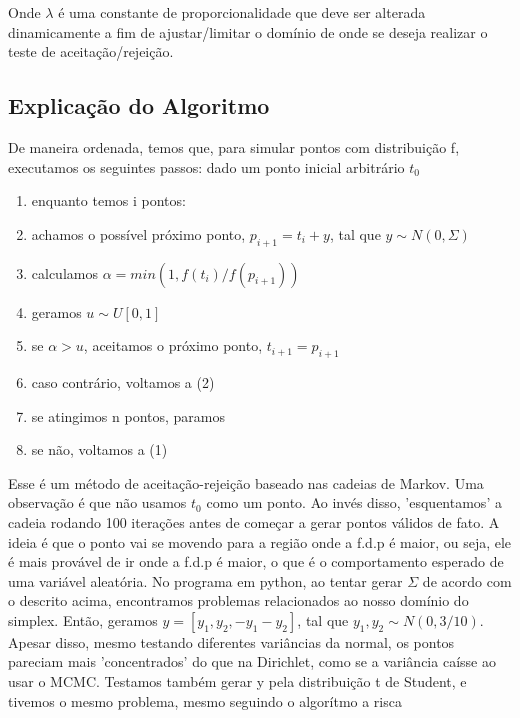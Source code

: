 \documentclass[12pt, a4paper]{article}
\begin{document}
Onde $\lambda$ é uma constante de proporcionalidade que deve ser alterada dinamicamente a fim de ajustar/limitar o domínio de onde se deseja realizar o teste de aceitação/rejeição. 













\subsection{Explicação do Algoritmo}
De maneira ordenada, temos que, para simular pontos com distribuição f, executamos os seguintes passos:
dado um ponto inicial arbitrário $t_0$

\begin{enumerate}[label=(\arabic*)]
    \item enquanto temos i pontos:
    \item achamos o possível próximo ponto, $p_{i+1} = t_i +y$, tal que $y \sim N(0,\Sigma)$
    \item calculamos $\alpha = min(1, f(t_i)/f(p_{i+1}))$
    \item geramos $u \sim U[0,1]$
    \item se $\alpha > u$, aceitamos o próximo ponto, $t_{i+1} = p_{i+1}$
    \item caso contrário, voltamos a (2)
    \item se atingimos n pontos, paramos
    \item se não, voltamos a (1)
\end{enumerate}

Esse é um método de aceitação-rejeição baseado nas cadeias de Markov. Uma observação é que não usamos $t_0$ como um ponto. Ao invés disso, 'esquentamos' a cadeia rodando 100 iterações antes de começar a gerar pontos válidos de fato. A ideia é que o ponto vai se movendo para a região onde a f.d.p é maior, ou seja, ele é mais provável de ir onde a f.d.p é maior, o que é o comportamento esperado de uma variável aleatória. 
No programa em python, ao tentar gerar $\Sigma$ de acordo com o descrito acima, encontramos problemas relacionados ao nosso domínio do simplex. Então, geramos $y = [y_1,y_2,-y_1 -y_2]$, tal que $y_1,y_2 \sim N(0, 3/10)$. Apesar disso, mesmo testando diferentes variâncias da normal, os pontos pareciam mais 'concentrados' do que na Dirichlet, como se a variância caísse ao usar o MCMC. Testamos também gerar y pela distribuição t de Student, e tivemos o mesmo problema, mesmo seguindo o algorítmo a risca
\end{document}

